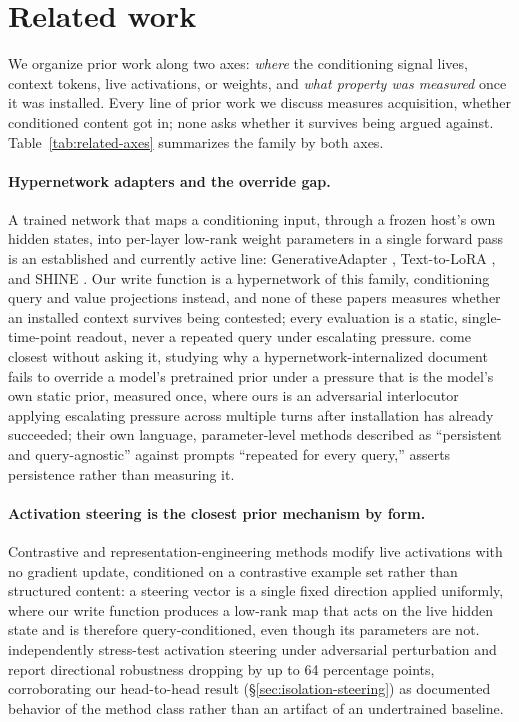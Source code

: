 \iflongversion
\section{Related work}
\label{sec:related}

We organize prior work along two axes: \emph{where} the conditioning signal lives,
context tokens, live activations, or weights, and \emph{what property was measured}
once it was installed. Every line of prior work we discuss measures acquisition, whether
conditioned content got in; none asks whether it survives being argued against.
Table~\ref{tab:related-axes} summarizes the family by both axes.

\paragraph{Hypernetwork adapters and the override gap.} A trained network that maps a
conditioning input, through a frozen host's own hidden states, into per-layer low-rank
weight parameters in a single forward pass is an established and currently active line:
GenerativeAdapter \citep{chen2025generativeadapter}, Text-to-LoRA
\citep{charakorn2025texttolora}, and SHINE \citep{liu2026shine}. Our write function is a
hypernetwork of this family, conditioning query and value projections instead, and none
of these papers measures whether an installed context survives being contested; every
evaluation is a static, single-time-point readout, never a repeated query under
escalating pressure. \citet{cheng2026overridegap} come closest without asking it,
studying why a hypernetwork-internalized document fails to override a model's
pretrained prior under a pressure that is the model's own static prior, measured once,
where ours is an adversarial interlocutor applying escalating pressure across multiple
turns after installation has already succeeded; their own language, parameter-level
methods described as ``persistent and query-agnostic'' against prompts ``repeated for
every query,'' asserts persistence rather than measuring it.

\paragraph{Activation steering is the closest prior mechanism by form.} Contrastive and
representation-engineering methods \citep{turner2023activation,zou2023representation,rimsky2024caa}
modify live activations with no gradient update, conditioned on a contrastive example
set rather than structured content: a steering vector is a single fixed direction
applied uniformly, where our write function produces a low-rank map that acts on the
live hidden state and is therefore query-conditioned, even though its parameters are
not. \citet{le2026steeringrobustness} independently stress-test activation steering
under adversarial perturbation and report directional robustness dropping by up to 64
percentage points, corroborating our head-to-head result (\S\ref{sec:isolation-steering})
as documented behavior of the method class rather than an artifact of an undertrained
baseline.

